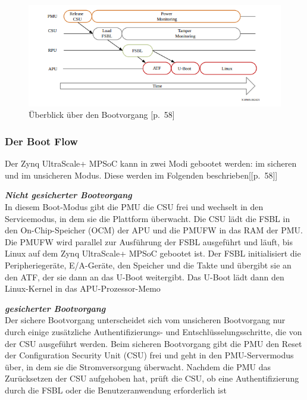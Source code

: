 \begin{figure}[h]
	\begin{center}
		\includegraphics[width=1.1\textwidth]{./images/boot-flow.jpg}
	\end{center}
	\vspace{-5pt}
	\caption[der Bootvorgang bei zynq+MPSoCs]{Überblick über den Bootvorgang \cite{XilinxInc.2019}[p.~58]} %
	\label{fig:boot:process}
	\vspace{-5pt}
\end{figure}


\subsubsection{Der Boot Flow}

Der Zynq UltraScale+ MPSoC kann in zwei Modi gebootet werden: im sicheren und im unsicheren Modus. Diese werden im Folgenden beschrieben[\cite{XilinxInc.2019}[p.~58]]

\textbf{\normalsize \textit{Nicht gesicherter Bootvorgang}}\\
In diesem Boot-Modus gibt die PMU die CSU frei und wechselt in den Servicemodus, in dem sie die Plattform überwacht. Die CSU lädt die FSBL in den On-Chip-Speicher (OCM) der APU und die PMUFW in das RAM der PMU. Die PMUFW wird parallel zur Ausführung der FSBL ausgeführt und läuft, bis Linux auf dem Zynq UltraScale+ MPSoC gebootet ist. Der FSBL initialisiert die Peripheriegeräte, E/A-Geräte, den Speicher und die Takte und übergibt sie an den ATF, der sie dann an das U-Boot weitergibt. Das U-Boot lädt dann den Linux-Kernel in das APU-Prozessor-Memo

\textbf{\normalsize \textit{gesicherter Bootvorgang}}\\
Der sichere Bootvorgang unterscheidet sich vom unsicheren Bootvorgang nur durch einige zusätzliche Authentifizierungs- und Entschlüsselungsschritte, die von der CSU ausgeführt werden. Beim sicheren Bootvorgang gibt die PMU den Reset der Configuration Security Unit (CSU) frei und geht in den PMU-Servermodus über, in dem sie die Stromversorgung überwacht. Nachdem die PMU das Zurücksetzen der CSU aufgehoben hat, prüft die CSU, ob eine Authentifizierung durch die FSBL oder die Benutzeranwendung erforderlich ist 

